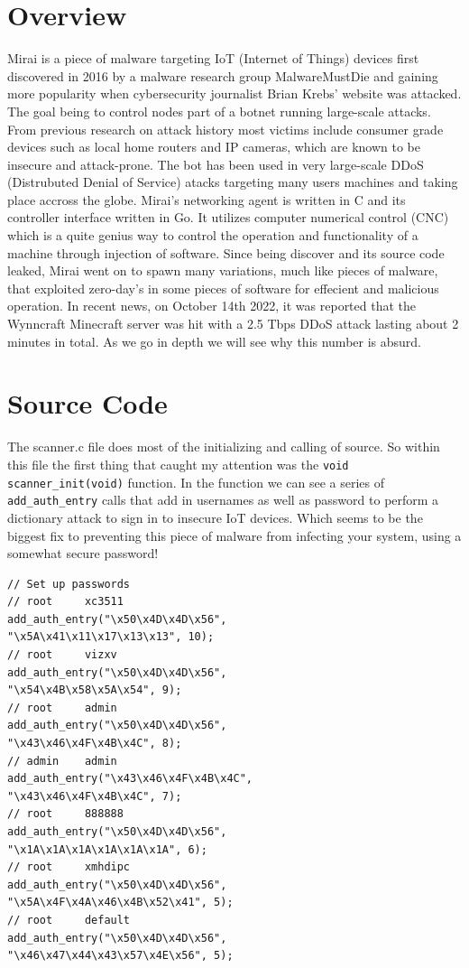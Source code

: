 \documentclass[12pt, letterpaper]{article}
\begin{document}
\begin{sloppypar}


\begin{flushleft}
\section{Overview}
Mirai is a piece of malware targeting IoT (Internet of Things) devices first discovered 
in 2016 by a malware research group MalwareMustDie and gaining more popularity when 
cybersecurity journalist Brian Krebs' website was attacked. The goal being to 
control nodes part of a botnet running large-scale attacks. From previous research on 
attack history most victims include consumer grade devices such as local home routers 
and IP cameras, which are known to be insecure and attack-prone. The bot has been used 
in very large-scale DDoS (Distrubuted Denial of Service) atacks targeting many users 
machines and taking place accross the globe. Mirai's networking agent is written in C 
and its controller interface written in Go. It utilizes computer numerical control (CNC) 
which is a quite genius way to control the operation and functionality of a machine 
through injection of software. Since being discover and its source code leaked, Mirai 
went on to spawn many variations, much like pieces of malware, that exploited zero-day's 
in some pieces of software for effecient and malicious operation. In recent news, on
October 14th 2022, it was reported that the Wynncraft Minecraft server was hit with
a 2.5 Tbps DDoS attack lasting about 2 minutes in total. As we go in depth we will see
why this number is absurd. 


\section{Source Code}
The scanner.c file does most of the initializing and calling of source. So within this
file the first thing that caught my attention was the \verb|void scanner_init(void)| 
function. In the function we can see a series of \verb|add_auth_entry| calls that add 
in usernames as well as password to perform a dictionary attack to sign in to insecure
IoT devices. Which seems to be the biggest fix to preventing this piece of malware from
infecting your system, using a somewhat secure password!

\begin{lstlisting}
// Set up passwords
// root     xc3511
add_auth_entry("\x50\x4D\x4D\x56", 
"\x5A\x41\x11\x17\x13\x13", 10);
// root     vizxv
add_auth_entry("\x50\x4D\x4D\x56", 
"\x54\x4B\x58\x5A\x54", 9);
// root     admin
add_auth_entry("\x50\x4D\x4D\x56",
"\x43\x46\x4F\x4B\x4C", 8);
// admin    admin
add_auth_entry("\x43\x46\x4F\x4B\x4C", 
"\x43\x46\x4F\x4B\x4C", 7);
// root     888888
add_auth_entry("\x50\x4D\x4D\x56", 
"\x1A\x1A\x1A\x1A\x1A\x1A", 6);
// root     xmhdipc
add_auth_entry("\x50\x4D\x4D\x56", 
"\x5A\x4F\x4A\x46\x4B\x52\x41", 5);
// root     default
add_auth_entry("\x50\x4D\x4D\x56", 
"\x46\x47\x44\x43\x57\x4E\x56", 5);
\end{lstlisting}


\end{flushleft}
\end{sloppypar}
\end{document}

